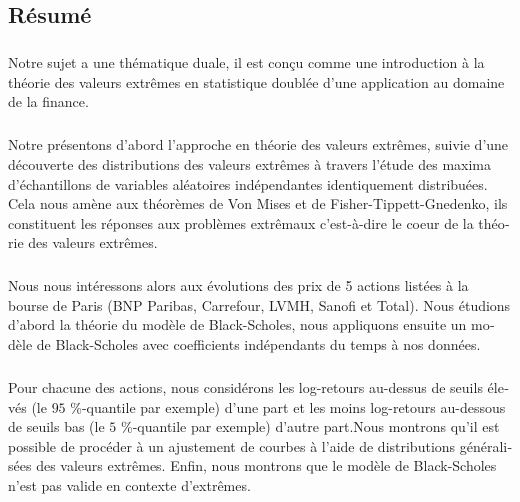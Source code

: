 \begin{otherlanguage}{french}
\cleardoublepage
\chapter*{Résumé}
\bigskip
\paragraph{}
Notre sujet a une thématique duale, il est con\c cu comme une introduction à la théorie des valeurs extrêmes en statistique doublée d'une application au domaine de la finance.
\paragraph{}
Notre présentons d'abord l'approche en théorie des valeurs extrêmes, suivie d'une découverte des distributions des valeurs extrêmes à travers l'étude des maxima d'échantillons de variables aléatoires indépendantes identiquement distribuées. Cela nous amène aux théorèmes de Von Mises et de Fisher-Tippett-Gnedenko, ils constituent les réponses aux problèmes extrêmaux c'est-à-dire le coeur de la théorie des valeurs extrêmes.
\paragraph{}
Nous nous intéressons alors aux évolutions des prix de 5 actions listées à la bourse de Paris (BNP Paribas, Carrefour, LVMH, Sanofi et Total). Nous étudions d'abord la théorie du modèle de Black-Scholes, nous appliquons ensuite un modèle de Black-Scholes avec coefficients indépendants du temps à nos données. 
\paragraph{}
Pour chacune des actions, nous considérons les log-retours au-dessus de seuils élevés (le $95$ \%-quantile par exemple) d'une part et les moins log-retours au-dessous de seuils bas (le $5$ \%-quantile par exemple) d'autre part.Nous montrons qu'il est possible de procéder à un ajustement de courbes à l'aide de distributions généralisées des valeurs extrêmes. Enfin, nous montrons que le modèle de Black-Scholes n'est pas valide en contexte d'extrêmes.
\vskip0.5cm
\end{otherlanguage}


